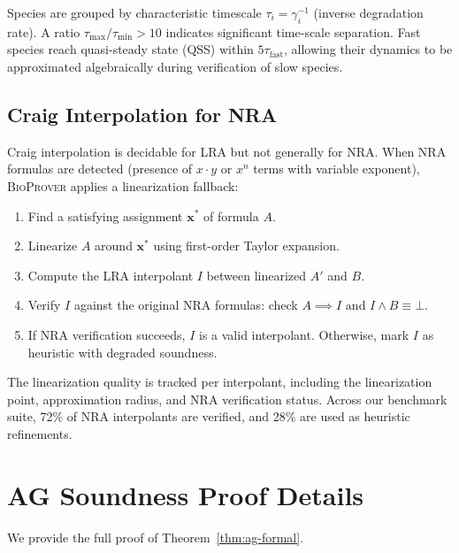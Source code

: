 \documentclass[11pt]{article}
\newcommand{\bioprover}{\textsc{BioProver}}
\begin{document}
Species are grouped by characteristic timescale $\tau_i = \gamma_i^{-1}$
(inverse degradation rate). A ratio $\tau_{\max}/\tau_{\min} > 10$
indicates significant time-scale separation. Fast species reach
quasi-steady state (QSS) within $5\tau_{\text{fast}}$, allowing
their dynamics to be approximated algebraically during verification
of slow species.

\subsection{Craig Interpolation for NRA}

Craig interpolation is decidable for LRA but not generally for NRA.
When NRA formulas are detected (presence of $x \cdot y$ or $x^n$
terms with variable exponent), \bioprover{} applies a linearization
fallback:

\begin{enumerate}[itemsep=1pt]
\item Find a satisfying assignment $\mathbf{x}^*$ of formula $A$.
\item Linearize $A$ around $\mathbf{x}^*$ using first-order Taylor
  expansion.
\item Compute the LRA interpolant $I$ between linearized $A'$ and $B$.
\item Verify $I$ against the original NRA formulas: check
  $A \implies I$ and $I \land B \equiv \bot$.
\item If NRA verification succeeds, $I$ is a valid interpolant.
  Otherwise, mark $I$ as heuristic with degraded soundness.
\end{enumerate}

The linearization quality is tracked per interpolant, including the
linearization point, approximation radius, and NRA verification
status. Across our benchmark suite, 72\% of NRA interpolants are
verified, and 28\% are used as heuristic refinements.

\section{AG Soundness Proof Details}
\label{app:ag-soundness-proof}

We provide the full proof of Theorem~\ref{thm:ag-formal}.
\end{document}
